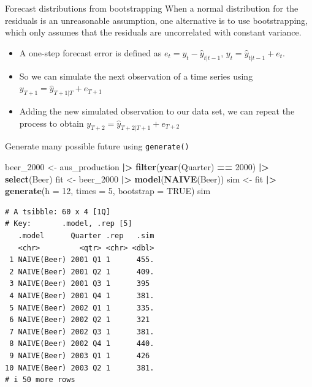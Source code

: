 \documentclass[
  14pt,
  ignorenonframetext,
  aspectratio=169,
]{beamer}
\newenvironment{Shaded}{\begin{snugshade}}{\end{snugshade}}
\newcommand{\AttributeTok}[1]{\textcolor[rgb]{0.13,0.29,0.53}{#1}}
\newcommand{\ConstantTok}[1]{\textcolor[rgb]{0.56,0.35,0.01}{#1}}
\newcommand{\DecValTok}[1]{\textcolor[rgb]{0.00,0.00,0.81}{#1}}
\newcommand{\FunctionTok}[1]{\textcolor[rgb]{0.13,0.29,0.53}{\textbf{#1}}}
\newcommand{\NormalTok}[1]{#1}
\newcommand{\OtherTok}[1]{\textcolor[rgb]{0.56,0.35,0.01}{#1}}
\newcommand{\SpecialCharTok}[1]{\textcolor[rgb]{0.81,0.36,0.00}{\textbf{#1}}}
\renewenvironment{Shaded}{\vspace*{0.15cm}\color{black}\fontsize{10}{10}\sf\begin{snugshade}\color{black}}{\end{snugshade}}
\begin{document}
\begin{frame}{Forecast distributions from bootstrapping}
\protect{}\label{forecast-distributions-from-bootstrapping}
When a normal distribution for the residuals is an unreasonable
assumption, one alternative is to use bootstrapping, which only assumes
that the residuals are uncorrelated with constant variance.

\begin{itemize}
\item
  A one-step forecast error is defined as
  \(e_t = y_t - \hat{y}_{t|t-1}\), \(y_t = \hat{y}_{t|t-1} + e_t.\)
\item
  So we can simulate the next observation of a time series using
  \(y_{T+1} = \hat{y}_{T+1|T} + e_{T+1}\)
\item
  Adding the new simulated observation to our data set, we can repeat
  the process to obtain \(y_{T+2} = \hat{y}_{T+2|T+1} + e_{T+2}\)
\end{itemize}
\end{frame}

\begin{frame}[fragile]{Generate many possible future using
\texttt{generate()}}
\protect{}\label{generate-many-possible-future-using-generate}
\fontsize{10}{13}\sf

\begin{Shaded}
\begin{Highlighting}[]
\NormalTok{beer\_2000 }\OtherTok{\textless{}{-}}\NormalTok{ aus\_production }\SpecialCharTok{|\textgreater{}} \FunctionTok{filter}\NormalTok{(}\FunctionTok{year}\NormalTok{(Quarter) }\SpecialCharTok{==} \DecValTok{2000}\NormalTok{) }\SpecialCharTok{|\textgreater{}} \FunctionTok{select}\NormalTok{(Beer)}
\NormalTok{fit }\OtherTok{\textless{}{-}}\NormalTok{ beer\_2000 }\SpecialCharTok{|\textgreater{}}
  \FunctionTok{model}\NormalTok{(}\FunctionTok{NAIVE}\NormalTok{(Beer))}
\NormalTok{sim }\OtherTok{\textless{}{-}}\NormalTok{ fit }\SpecialCharTok{|\textgreater{}} \FunctionTok{generate}\NormalTok{(}\AttributeTok{h =} \DecValTok{12}\NormalTok{, }\AttributeTok{times =} \DecValTok{5}\NormalTok{, }\AttributeTok{bootstrap =} \ConstantTok{TRUE}\NormalTok{)}
\NormalTok{sim}
\end{Highlighting}
\end{Shaded}

\begin{verbatim}
# A tsibble: 60 x 4 [1Q]
# Key:       .model, .rep [5]
   .model      Quarter .rep   .sim
   <chr>         <qtr> <chr> <dbl>
 1 NAIVE(Beer) 2001 Q1 1      455.
 2 NAIVE(Beer) 2001 Q2 1      409.
 3 NAIVE(Beer) 2001 Q3 1      395 
 4 NAIVE(Beer) 2001 Q4 1      381.
 5 NAIVE(Beer) 2002 Q1 1      335.
 6 NAIVE(Beer) 2002 Q2 1      321 
 7 NAIVE(Beer) 2002 Q3 1      381.
 8 NAIVE(Beer) 2002 Q4 1      440.
 9 NAIVE(Beer) 2003 Q1 1      426 
10 NAIVE(Beer) 2003 Q2 1      381.
# i 50 more rows
\end{verbatim}
\end{frame}
\end{document}
